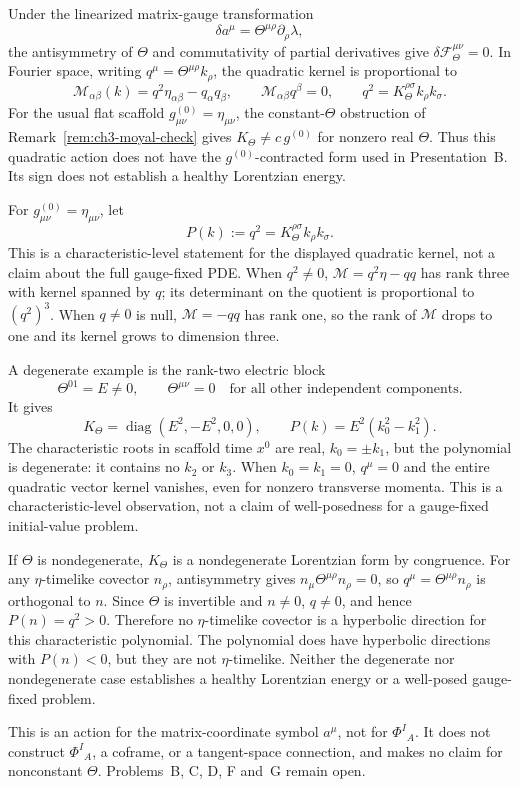 \begin{remark}
Under the linearized matrix-gauge transformation
\[
  \delta a^\mu=\Theta^{\mu\rho}\partial_\rho\lambda,
\]
the antisymmetry of \(\Theta\) and commutativity of partial
derivatives give \(\delta\mathcal F_\Theta^{\mu\nu}=0\). In Fourier
space, writing \(q^\mu=\Theta^{\mu\rho}k_\rho\), the quadratic
kernel is proportional to
\[
  \mathcal M_{\alpha\beta}(k)
  =q^2\eta_{\alpha\beta}-q_\alpha q_\beta,
  \qquad
  \mathcal M_{\alpha\beta}q^\beta=0,
  \qquad q^2=K_\Theta^{\rho\sigma}k_\rho k_\sigma .
\]
For the usual flat scaffold \(g^{(0)}_{\mu\nu}=\eta_{\mu\nu}\),
the constant-\(\Theta\) obstruction of
Remark~\ref{rem:ch3-moyal-check} gives
\(K_\Theta\ne c\,g^{(0)}\) for nonzero real \(\Theta\). Thus this
quadratic action does not have the \(g^{(0)}\)-contracted form used
in Presentation~B. Its sign does not establish a healthy Lorentzian
energy.

For \(g^{(0)}_{\mu\nu}=\eta_{\mu\nu}\), let
\[
  P(k):=q^2=K_\Theta^{\rho\sigma}k_\rho k_\sigma .
\]
This is a characteristic-level statement for the displayed
quadratic kernel, not a claim about the full gauge-fixed PDE. When
\(q^2\ne0\), \(\mathcal M=q^2\eta-qq\) has rank three with kernel
spanned by \(q\); its determinant on the quotient is proportional
to \((q^2)^3\). When \(q\ne0\) is null,
\(\mathcal M=-qq\) has rank one, so the rank of \(\mathcal M\) drops
to one and its kernel grows to dimension three.

A degenerate example is the rank-two electric block
\[
  \Theta^{01}=E\ne0,\qquad
  \Theta^{\mu\nu}=0
  \quad\text{for all other independent components}.
\]
It gives
\[
  K_\Theta=\operatorname{diag}(E^2,-E^2,0,0),
  \qquad
  P(k)=E^2(k_0^2-k_1^2).
\]
The characteristic roots in scaffold time \(x^0\) are real,
\(k_0=\pm k_1\), but the polynomial is degenerate: it contains no
\(k_2\) or \(k_3\). When \(k_0=k_1=0\), \(q^\mu=0\) and the entire
quadratic vector kernel vanishes, even for nonzero transverse
momenta. This is a characteristic-level observation, not a claim
of well-posedness for a gauge-fixed initial-value problem.

If \(\Theta\) is nondegenerate, \(K_\Theta\) is a nondegenerate
Lorentzian form by congruence. For any \(\eta\)-timelike covector
\(n_\rho\), antisymmetry gives
\(n_\mu\Theta^{\mu\rho}n_\rho=0\), so
\(q^\mu=\Theta^{\mu\rho}n_\rho\) is orthogonal to \(n\).
Since \(\Theta\) is invertible and \(n\ne0\), \(q\ne0\), and hence
\(P(n)=q^2>0\). Therefore no \(\eta\)-timelike covector is a
hyperbolic direction for this characteristic polynomial. The
polynomial does have hyperbolic directions with \(P(n)<0\), but
they are not \(\eta\)-timelike. Neither the degenerate nor
nondegenerate case establishes a healthy Lorentzian energy or a
well-posed gauge-fixed problem.

This is an action for the matrix-coordinate symbol \(a^\mu\),
not for \(\Phi^I{}_A\). It does not construct \(\Phi^I{}_A\), a
coframe, or a tangent-space connection, and makes no claim for
nonconstant \(\Theta\). Problems~B, C, D, F and~G remain open.
\end{remark}
